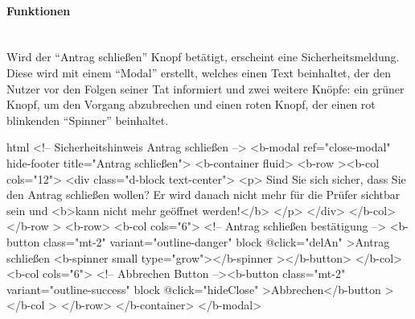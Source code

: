 \paragraph{Funktionen}
~\\
Wird der \enquote{Antrag schließen} Knopf betätigt, erscheint eine Sicherheitsmeldung. Diese wird mit einem \enquote{Modal} erstellt, welches einen Text beinhaltet, der den Nutzer vor den Folgen seiner Tat informiert und zwei weitere Knöpfe: ein grüner Knopf, um den Vorgang abzubrechen und einen roten Knopf, der einen rot blinkenden \enquote{Spinner} beinhaltet.
\begin{code}{html}
	<!-- Sicherheitshinweis Antrag schließen -->
    <b-modal ref="close-modal" hide-footer title="Antrag schließen">
      <b-container fluid>
        <b-row
          ><b-col cols="12">
            <div class="d-block text-center">
              <p>
                Sind Sie sich sicher, dass Sie den Antrag schließen wollen? Er
                wird danach nicht mehr für die Prüfer sichtbar sein und
                <b>kann nicht mehr geöffnet werden!</b>
              </p>
            </div>
          </b-col></b-row
        >
        <b-row>
          <b-col cols="6">
            <!-- Antrag schließen bestätigung -->
            <b-button class="mt-2" variant="outline-danger" block @click="delAn"
              >Antrag schließen <b-spinner small type="grow"></b-spinner
            ></b-button>
          </b-col>
          <b-col cols="6">
            <!-- Abbrechen Button --><b-button
              class="mt-2"
              variant="outline-success"
              block
              @click="hideClose"
              >Abbrechen</b-button
            ></b-col
          >
        </b-row>
      </b-container>
    </b-modal>
\end{code}
	\label{list:securityalert} ~\\
~\\

\newpage
